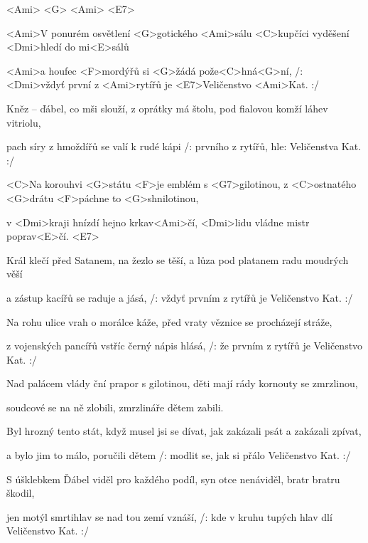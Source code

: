 

<Ami>	<G>	<Ami>	<E7>

\zs
<Ami>V ponurém osvětlení <G>gotického <Ami>sálu
<C>kupčíci vyděšení <Dmi>hledí do mi<E>sálů

<Ami>a houfec <F>mordýřů si <G>žádá pože<C>hná<G>ní,
/: <Dmi>vždyť první z <Ami>rytířů je <E7>Veličenstvo <Ami>Kat. :/
\ks

\zs
Kněz -- ďábel, co mši slouží, z oprátky má štolu,
pod fialovou komží láhev vitriolu,

pach síry z hmoždířů se valí k rudé kápi
/: prvního z rytířů, hle: Veličenstva Kat. :/
\ks

\zr
<C>Na korouhvi <G>státu <F>je emblém s <G7>gilotinou,
z <C>ostnatého <G>drátu <F>páchne to <G>shnilotinou,

v <Dmi>kraji hnízdí hejno krkav<Ami>čí,
<Dmi>lidu vládne mistr poprav<E>čí. <E7>
\kr

\zs
Král klečí před Satanem, na žezlo se těší,
a lůza pod platanem radu moudrých věší

a zástup kacířů se raduje a jásá,
/: vždyť prvním z rytířů je Veličenstvo Kat. :/
\ks

\zs
Na rohu ulice vrah o morálce káže,
před vraty věznice se procházejí stráže,

z vojenských pancířů vstříc černý nápis hlásá,
/: že prvním z rytířů je Veličenstvo Kat. :/
\ks

\zr
Nad palácem vlády ční prapor s gilotinou,
děti mají rády kornouty se zmrzlinou,

soudcové se na ně zlobili,
zmrzlináře dětem zabili.
\kr

\zs
Byl hrozný tento stát, když musel jsi se dívat,
jak zakázali psát a zakázali zpívat,

a bylo jim to málo, poručili dětem
/: modlit se, jak si přálo Veličenstvo Kat. :/
\ks

\zs
S úšklebkem Ďábel viděl pro každého podíl,
syn otce nenáviděl, bratr bratru škodil,

jen motýl smrtihlav se nad tou zemí vznáší,
/: kde v kruhu tupých hlav dlí Veličenstvo Kat. :/
\ks

\kp
